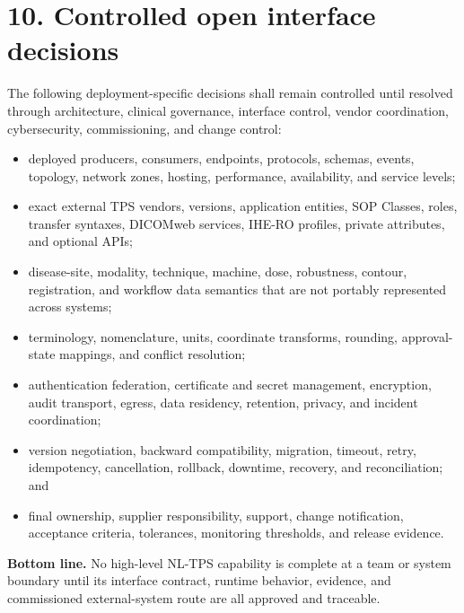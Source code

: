\documentclass[11pt,letterpaper]{article}
\begin{document}
\section{10. Controlled open interface decisions}
The following deployment-specific decisions shall remain controlled until resolved through architecture, clinical governance, interface control, vendor coordination, cybersecurity, commissioning, and change control:
\begin{itemize}
\item deployed producers, consumers, endpoints, protocols, schemas, events, topology, network zones, hosting, performance, availability, and service levels;
\item exact external TPS vendors, versions, application entities, SOP Classes, roles, transfer syntaxes, DICOMweb services, IHE-RO profiles, private attributes, and optional APIs;
\item disease-site, modality, technique, machine, dose, robustness, contour, registration, and workflow data semantics that are not portably represented across systems;
\item terminology, nomenclature, units, coordinate transforms, rounding, approval-state mappings, and conflict resolution;
\item authentication federation, certificate and secret management, encryption, audit transport, egress, data residency, retention, privacy, and incident coordination;
\item version negotiation, backward compatibility, migration, timeout, retry, idempotency, cancellation, rollback, downtime, recovery, and reconciliation; and
\item final ownership, supplier responsibility, support, change notification, acceptance criteria, tolerances, monitoring thresholds, and release evidence.
\end{itemize}
\textbf{Bottom line. }No high-level NL-TPS capability is complete at a team or system boundary until its interface contract, runtime behavior, evidence, and commissioned external-system route are all approved and traceable.
\end{document}
